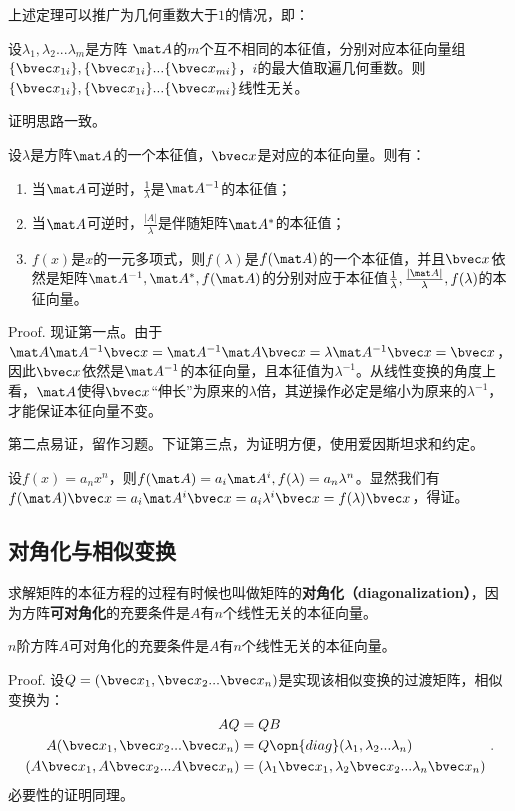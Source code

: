 上述定理可以推广为几何重数大于$1$的情况，即：
\begin{corollary}{}\label{cor_MatEig_1}
设$\lambda_1,\lambda_2...\lambda_m$是方阵 $\mat A$的$m$个互不相同的本征值，分别对应本征向量组$\{\bvec x_{1i}\},\{\bvec x_{1i}\}...\{\bvec x_{mi}\}$，$i$的最大值取遍几何重数。则$\{\bvec x_{1i}\},\{\bvec x_{1i}\}...\{\bvec x_{mi}\}$线性无关。
\end{corollary}
证明思路一致。


\begin{theorem}{}
设$\lambda$是方阵$\mat A$的一个本征值，$\bvec x$是对应的本征向量。则有：
\begin{enumerate}
\item 当$\mat A$可逆时，$\frac{1}{\lambda }$是$\mat A^{-1}$的本征值；
\item 当$\mat A$可逆时，$\frac{|A|}{\lambda }$是伴随矩阵$\mat A^{*}$的本征值；
\item $f(x)$是$x$的一元多项式，则$f(\lambda)$是$f(\mat A)$的一个本征值，并且$\bvec x$依然是矩阵$\mat A^{-1},\mat A^{*},f(\mat A)$的分别对应于本征值$\frac{1}{\lambda},\frac{|\mat A|}{\lambda},f(\lambda)$的本征向量。
\end{enumerate}
\end{theorem}
Proof.
现证第一点。由于$\mat A\mat A^{-1}\bvec x=\mat A^{-1}\mat A \bvec x=\lambda \mat A^{-1} \bvec x=\bvec x$，因此$\bvec x$依然是$\mat A^{-1}$的本征向量，且本征值为$\lambda^{-1} $。从线性变换的角度上看，$\mat A$使得$\bvec x$“伸长”为原来的$\lambda$倍，其逆操作必定是缩小为原来的$\lambda^{-1}$，才能保证本征向量不变。

第二点易证，留作习题。下证第三点，为证明方便，使用爱因斯坦求和约定。

设$f(x)=a_nx^n$，则$f(\mat A)=a_i\mat A^i,f(\lambda)=a_n\lambda ^n$。显然我们有$f(\mat A)\bvec x=a_i\mat A^i \bvec x=a_i\lambda^i \bvec x=f(\lambda)\bvec x$，得证。

\subsection{对角化与相似变换}

求解矩阵的本征方程的过程有时候也叫做矩阵的\textbf{对角化（diagonalization）}，因为方阵\textbf{可对角化}的充要条件是$A$有$n$个线性无关的本征向量。
\begin{theorem}{}\label{the_MatEig_1}
$n$阶方阵$A$可对角化的充要条件是$A$有$n$个线性无关的本征向量。
\end{theorem}
Proof.
设$Q=(\bvec x_1,\bvec x_2...
\bvec x_n)$是实现该相似变换的过渡矩阵，相似变换为：
\begin{equation}
\begin{aligned}
AQ&=QB\\
A(\bvec x_1,\bvec x_2...
\bvec x_n)&=Q\opn{diag}(\lambda_1,\lambda_2...\lambda_n)\\
(A\bvec x_1,A\bvec x_2...
A\bvec x_n)&=(\lambda_1 \bvec x_1,\lambda_2\bvec x_2...\lambda_n\bvec x_n)\\
\end{aligned}~.
\end{equation}
必要性的证明同理。

